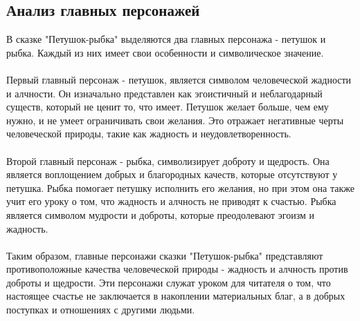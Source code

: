 \documentclass{article}
\begin{document}
\subsection{Анализ главных персонажей}
В сказке "{}{}Петушок-рыбка"{}{} выделяются два главных персонажа - петушок и рыбка. Каждый из них имеет свои особенности и символическое значение.\\
~\\
Первый главный персонаж - петушок, является символом человеческой жадности и алчности. Он изначально представлен как эгоистичный и неблагодарный существ, который не ценит то, что имеет. Петушок желает больше, чем ему нужно, и не умеет ограничивать свои желания. Это отражает негативные черты человеческой природы, такие как жадность и неудовлетворенность.\\
~\\
Второй главный персонаж - рыбка, символизирует доброту и щедрость. Она является воплощением добрых и благородных качеств, которые отсутствуют у петушка. Рыбка помогает петушку исполнить его желания, но при этом она также учит его уроку о том, что жадность и алчность не приводят к счастью. Рыбка является символом мудрости и доброты, которые преодолевают эгоизм и жадность.\\
~\\
Таким образом, главные персонажи сказки "{}{}Петушок-рыбка"{}{} представляют противоположные качества человеческой природы - жадность и алчность против доброты и щедрости. Эти персонажи служат уроком для читателя о том, что настоящее счастье не заключается в накоплении материальных благ, а в добрых поступках и отношениях с другими людьми.\\
~\\

\newpage
\end{document}
